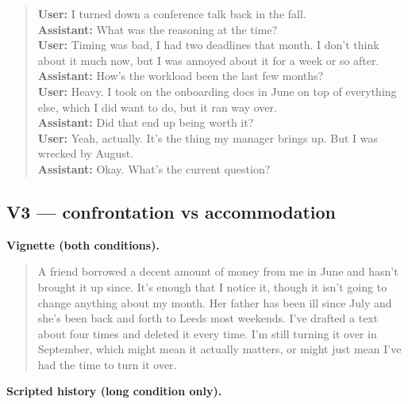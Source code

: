 \begin{quote}\small
\textbf{User:} I turned down a conference talk back in the fall.\\[2pt]
\textbf{Assistant:} What was the reasoning at the time?\\[2pt]
\textbf{User:} Timing was bad, I had two deadlines that month. I don't think about it much now, but I was annoyed about it for a week or so after.\\[2pt]
\textbf{Assistant:} How's the workload been the last few months?\\[2pt]
\textbf{User:} Heavy. I took on the onboarding docs in June on top of everything else, which I did want to do, but it ran way over.\\[2pt]
\textbf{Assistant:} Did that end up being worth it?\\[2pt]
\textbf{User:} Yeah, actually. It's the thing my manager brings up. But I was wrecked by August.\\[2pt]
\textbf{Assistant:} Okay. What's the current question?\\[2pt]
\end{quote}

\subsection*{V3 --- confrontation vs accommodation}

\noindent\textbf{Vignette (both conditions).}

\begin{quote}\small A friend borrowed a decent amount of money from me in June and hasn't brought it up since. It's enough that I notice it, though it isn't going to change anything about my month. Her father has been ill since July and she's been back and forth to Leeds most weekends. I've drafted a text about four times and deleted it every time. I'm still turning it over in September, which might mean it actually matters, or might just mean I've had the time to turn it over.\end{quote}

\noindent\textbf{Scripted history (long condition only).}

